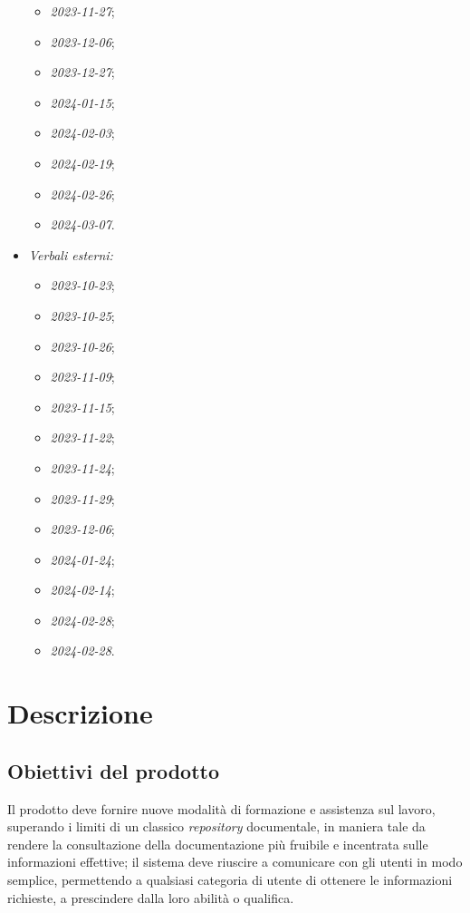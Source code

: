\documentclass[10pt, a4paper]{article}
\begin{document}
\begin{itemize}
\begin{itemize}
            \item \textit{2023-11-27};
            \item \textit{2023-12-06};
            \item \textit{2023-12-27};
            \item \textit{2024-01-15};
            \item \textit{2024-02-03};
            \item \textit{2024-02-19};
            \item \textit{2024-02-26};
            \item \textit{2024-03-07}.
        \end{itemize}
    \item \textit{Verbali esterni:}
        \begin{itemize}
            \item \textit{2023-10-23};
            \item \textit{2023-10-25};
            \item \textit{2023-10-26};
            \item \textit{2023-11-09};
            \item \textit{2023-11-15};
            \item \textit{2023-11-22};
            \item \textit{2023-11-24};
            \item \textit{2023-11-29};
            \item \textit{2023-12-06};
            \item \textit{2024-01-24};
            \item \textit{2024-02-14};
            \item \textit{2024-02-28};
            \item \textit{2024-02-28}.
        \end{itemize}
\end{itemize}

\newpage
\section{Descrizione}
\subsection{Obiettivi del prodotto}
Il prodotto deve fornire nuove modalità di formazione e assistenza sul lavoro, superando i limiti di un classico \textit{repository} documentale, in maniera tale da rendere la consultazione della documentazione più fruibile e incentrata sulle informazioni effettive; il sistema deve riuscire a comunicare con gli utenti in modo semplice, permettendo a qualsiasi categoria di utente di ottenere le informazioni richieste, a prescindere dalla loro abilità o qualifica.
\end{document}

